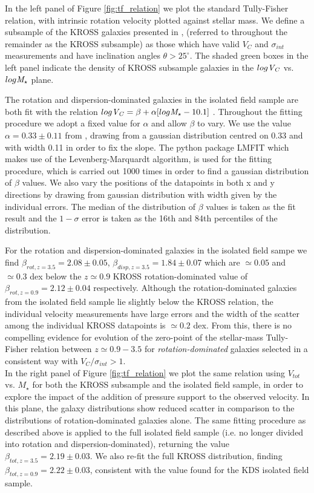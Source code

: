 \documentclass[fleqn,usenatbib]{mnras}
\begin{document}
In the left panel of Figure \ref{fig:tf_relation} we plot the standard Tully-Fisher relation, with intrinsic rotation velocity plotted against stellar mass.
We define a subsample of the KROSS galaxies presented in \cite{Harrison2017}, (referred to throughout the remainder as the KROSS subsample) as those which have valid $V_{C}$ and $\sigma_{int}$ measurements and have inclination angles $\theta > 25^{\circ}$.
The shaded green boxes in the left panel indicate the density of KROSS subsample galaxies in the $log{\it V_{C}}$ vs. $log{\it M_{\star}}$ plane.

The rotation and dispersion-dominated galaxies in the isolated field sample are both fit with the relation $log{\it V_{C}} = \beta + \alpha[log{\it M_{\star}} - 10.1]$ \citep[e.g.][]{Reyes2011,Harrison2017}.
Throughout the fitting procedure we adopt a fixed value for $\alpha$ and allow $\beta$ to vary.
We use the value $\alpha=0.33\pm0.11$ from \cite{Harrison2017}, drawing from a gaussian distribution centred on 0.33 and with width 0.11 in order to fix the slope.
The python package {\scriptsize LMFIT} \citep{Newville2014} which makes use of the Levenberg-Marquardt algorithm, is used for the fitting procedure, which is carried out 1000 times in order to find a gaussian distribution of $\beta$ values.
We also vary the positions of the datapoints in both x and y directions by drawing from gaussian distribution with width given by the individual errors. 
The median of the distribution of $\beta$ values is taken as the fit result and the $1-\sigma$ error is taken as the 16th and 84th percentiles of the distribution.

For the rotation and dispersion-dominated galaxies in the isolated field sampe we find $\beta_{rot,z=3.5} = 2.08\pm0.05$, $\beta_{disp,z=3.5} = 1.84\pm0.07$ which are $\simeq0.05$ and $\simeq0.3$ dex below the $z\simeq0.9$ KROSS rotation-dominated value of $\beta_{rot,z=0.9} = 2.12\pm0.04$ \citep{Harrison2017} respectively.
Although the rotation-dominated galaxies from the isolated field sample lie slightly below the KROSS relation, the individual velocity measurements have large errors and the width of the scatter among the individual KROSS datapoints is $\simeq0.2$ dex.
From this, there is no compelling evidence for evolution of the zero-point of the stellar-mass Tully-Fisher relation between $z\simeq0.9-3.5$ for {\it rotation-dominated} galaxies selected in a consistent way with $V_{C}/\sigma_{int} > 1$. \\

\noindent
In the right panel of Figure \ref{fig:tf_relation} we plot the same relation using $V_{tot}$ vs. $M_{\star}$ for both the KROSS subsample and the isolated field sample, in order to explore the impact of the addition of pressure support to the observed velocity.
In this plane, the galaxy distributions show reduced scatter in comparison to the distributions of rotation-dominated galaxies alone.
The same fitting procedure as described above is applied to the full isolated field sample (i.e. no longer divided into rotation and dispersion-dominated), returning the value $\beta_{tot,z=3.5} = 2.19\pm0.03$.
We also re-fit the full KROSS distribution, finding $\beta_{tot,z=0.9} = 2.22\pm0.03$, consistent with the value found for the KDS isolated field sample.
\end{document}
